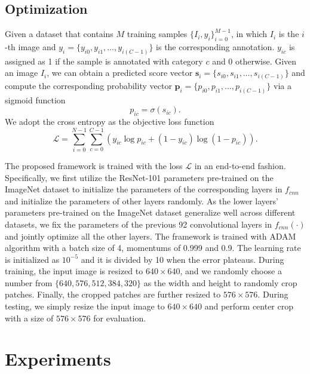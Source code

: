 \documentclass[10pt,twocolumn,letterpaper]{article}
\begin{document}
\subsection{Optimization}
\label{sec:optimization}
Given a dataset that contains $M$ training samples $\{I_i, y_i\}_{i=0}^{M-1}$, in which $I_i$ is the $i$-th image and $y_i=\{y_{i0}, y_{i1}, \dots, y_{i(C-1)}\}$ is the corresponding annotation. $y_{ic}$ is assigned as 1 if the sample is annotated with category $c$ and 0 otherwise. Given an image $I_i$, we can obtain a predicted score vector $\mathbf{s}_i=\{s_{i0}, s_{i1}, \dots, s_{i(C-1)}\}$ and compute the corresponding probability vector $\mathbf{p}_i=\{p_{i0}, p_{i1}, \dots, p_{i(C-1)}\}$ via a sigmoid function
\begin{equation}
  p_{ic}=\sigma(s_{ic}).
\end{equation}
We adopt the cross entropy as the objective loss function
\begin{equation}
  \mathcal{L}=\sum_{i=0}^{N-1}\sum_{c=0}^{C-1}\left(y_{ic}\log p_{ic}+(1-y_{ic})\log(1-p_{ic})\right).
\end{equation}


The proposed framework is trained with the loss $\mathcal{L}$ in an end-to-end fashion. Specifically, we first utilize the ResNet-101 parameters pre-trained on the ImageNet dataset \cite{deng2009imagenet} to initialize the parameters of the corresponding layers in $f_{cnn}$ and initialize the parameters of other layers randomly. As the lower layers' parameters pre-trained on the ImageNet dataset generalize well across different datasets, we fix the parameters of the previous 92 convolutional layers in $f_{cnn}(\cdot)$ and jointly optimize all the other layers. The framework is trained with ADAM algorithm \cite{kingma2014adam} with a batch size of 4, momentums of 0.999 and 0.9. The learning rate is initialized as $10^{-5}$ and it is divided by 10 when the error plateaus. During training, the input image is resized to $640\times 640$, and we randomly choose a number from $\{640, 576, 512, 384, 320\}$ as the width and height to randomly crop patches. Finally, the cropped patches are further resized to $576\times 576$. During testing, we simply resize the input image to $640\times 640$ and perform center crop with a size of $576\times 576$ for evaluation.



\section{Experiments}
\end{document}
